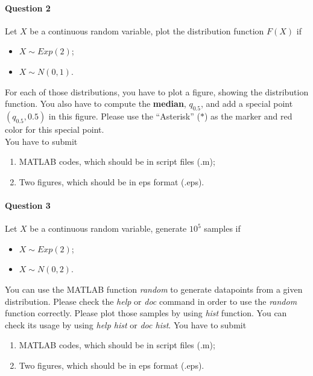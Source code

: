 \documentclass[11pt]{article} %
\begin{document}
\paragraph*{Question 2}
Let $X$ be a continuous random variable, plot the distribution function $F(X)$ if 
\begin{itemize}
\item $X \sim Exp(2)$;
\item $X \sim N(0, 1)$. 
\end{itemize}
For each of those distributions, you have to plot a figure, showing the distribution function. You also have to compute the {\bf median}, $q_{0.5}$, and add a special point $(q_{0.5}, 0.5)$ in this figure. Please use the ``Asterisk'' ($\ast$) as the marker and {\color{red}red} color for this special point. \\
You have to submit 
\begin{enumerate}
\item MATLAB codes, which should be in script files (.m);
\item Two figures, which should be in eps format (.eps).
\end{enumerate}

\paragraph*{Question 3}

Let $X$ be a continuous random variable, generate $10^5$ samples if 
\begin{itemize}
\item $X \sim Exp(2)$;
\item $X \sim N(0, 2)$. 
\end{itemize}
You can use the MATLAB function {\it random} to generate datapoints from a given distribution. Please check the {\it help} or {\it doc} command in order to use the {\it random} function correctly. Please plot those samples by using {\it hist} function. You can check its usage by using {\it help hist} or {\it doc hist}.  
You have to submit 
\begin{enumerate}
\item MATLAB codes, which should be in script files (.m);
\item Two figures, which should be in eps format (.eps).
\end{enumerate}
\end{document}
